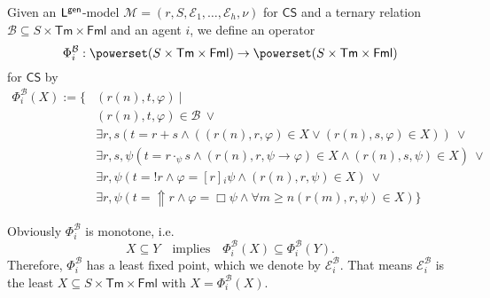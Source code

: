 \documentclass[envcountsect,envcountsame,oribibl,orivec]{llncs}
\newcommand{\Formulae}{\textsf{Fml}}
\newcommand{\lalways}{\Box}
\newcommand{\Terms}{\textsf{Tm}}
\newcommand{\jbox}[1]{\left[#1\right]\!}
\newcommand{\tinspect}{!}
\newcommand{\tgeneralize}{\Uparrow}
\newcommand{\CS}{\textsf{CS}}
\newcommand{\numberofagents}{h}
\newcommand{\evidence}{\mathcal{E}}
\newcommand{\valuation}{\nu}
\newcommand{\M}{\mathcal{M}}
\renewcommand{\phi}{\varphi}
\newcommand{\B}{\mathcal{B}}
\newcommand{\Op}[1]{\Phi^{#1}}
\newcommand{\OpB}{\Op{\B}_i}
\begin{document}
Given an ${\sf L}^{\sf gen}$-model $\M = (r,S,\evidence_1,\ldots,\evidence_\numberofagents, \valuation)$ for $\CS$ and a ternary relation $\B \subseteq S \times \Terms \times \Formulae$ and an agent $i$,
we define an operator 
\[
\Op{\B}_i: \powerset(S \times \Terms \times \Formulae)  \to  \powerset(S \times \Terms \times \Formulae)
\]
for $\CS$ by
\begin{equation*}
\begin{split}
\OpB(X) := \{ &(r(n),t,\phi) \ |\ \\
& (r(n),t,\phi) \in \B \ \lor \\
& \exists r, s (t=r+s \land ( (r(n),r,\phi) \in X \lor   (r(n),s,\phi) \in X )) \ \lor \\
& \exists r,s,\psi (t = r \cdot_\psi s \land (r(n),r,\psi \to \phi) \in X \land (r(n),s,\psi) \in X) \ \lor\\
& \exists r, \psi  (t= \tinspect r \land \phi = \jbox{r}_i \psi  \land  (r(n),r,\psi) \in X )  \ \lor\\
& \exists r,\psi ( t = \tgeneralize r \land \phi = \lalways \psi \land \forall m \geq n (r(m),r,\psi) \in X) 
\}
\end{split}
\end{equation*}


Obviously $\OpB$ is monotone, i.e.
\[
X \subseteq Y
\quad\text{implies}\quad
\OpB(X) \subseteq \OpB(Y).
\]
Therefore, $\OpB$ has a least fixed point, which we denote by $\evidence_i^\mathcal{B}$. That means $\evidence_i^\mathcal{B}$ is the least $X \subseteq  S \times \Terms \times \Formulae$ with
$X = \OpB(X)$.
\end{document}
